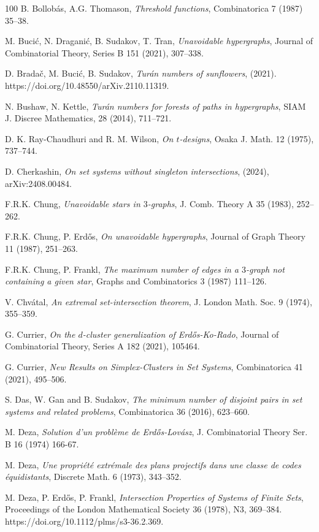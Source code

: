 \documentclass[graybox]{svmult}
\begin{document}
\begin{thebibliography}{100}
 B. Bollob\'as, A.G. Thomason, {\it Threshold functions}, Combinatorica 7 (1987) 35–38.

 M. Buci\'c, N. Dragani\'c, B. Sudakov, T. Tran, {\it Unavoidable hypergraphs}, Journal of Combinatorial Theory, Series B 151 (2021), 307--338.

 D. Brada\v c, M. Buci\'c, B. Sudakov, {\it Tur\'an numbers of sunflowers}, (2021). https://doi.org/10.48550/arXiv.2110.11319.

 N. Bushaw, N. Kettle, {\it Tur\'an numbers for forests of paths in hypergraphs}, SIAM J. Discree Mathematics, 28 (2014), 711--721.

 D. K. Ray-Chaudhuri and R. M. Wilson, {\it On $t$-designs}, Osaka J. Math. 12 (1975), 737--744.

 D. Cherkashin, {\it On set systems without singleton intersections}, (2024), arXiv:2408.00484.

 F.R.K. Chung, {\it Unavoidable stars in $3$-graphs}, J. Comb. Theory A 35 (1983), 252--262.

 F.R.K. Chung, P. Erd\H os, {\it On unavoidable hypergraphs}, Journal of Graph Theory 11 (1987), 251--263.

 F.R.K. Chung, P. Frankl, {\it The maximum number of edges in a $3$-graph not containing a given star}, Graphs and Combinatorics 3 (1987) 111--126.


 V. Chv\'atal, {\it An extremal set-intersection theorem}, J. London Math. Soc. 9 (1974), 355--359.


 G. Currier, {\it On the $d$-cluster generalization of Erd\H os-Ko-Rado}, Journal of Combinatorial Theory, Series A 182 (2021), 105464.

 G. Currier, {\it New Results on Simplex-Clusters in Set Systems}, Combinatorica 41 (2021), 495–506.

 S. Das, W. Gan and B. Sudakov, {\it The minimum number of disjoint pairs in set systems and related problems}, Combinatorica 36 (2016), 623--660.

 M. Deza, {\it Solution d'un probl\`eme de Erd\H os-Lov\'asz}, J. Combinatorial Theory Ser. B 16 (1974) 166-67.

 M. Deza, {\it Une propri\'et\'e extr\'emale des plans projectifs dans une classe de codes \'equidistants}, Discrete Math. 6 (1973), 343--352.

 M. Deza, P. Erd\H os, P. Frankl, {\it Intersection Properties of Systems of Finite Sets}, Proceedings of the London Mathematical Society 36 (1978), N3, 369--384. https://doi.org/10.1112/plms/s3-36.2.369.


\end{thebibliography}
\end{document}
